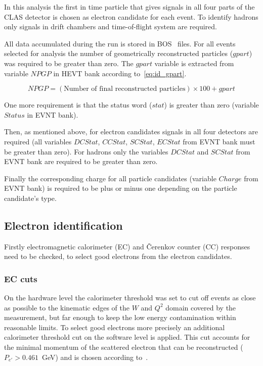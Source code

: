 In this analysis the first in time particle that gives signals in all four parts of the CLAS detector is chosen as electron candidate for each event. To identify hadrons only signals in drift chambers and time-of-flight system are required.

All data accumulated during the run is stored in BOS~\cite{BOS:bank} files. For all events selected for analysis the number of geometrically reconstructed particles ($gpart$) was required to be greater than zero. The $gpart$ variable is extracted from variable $NPGP$ in HEVT bank according to~\ref{eq:id_gpart}. 

\begin{equation}
NPGP=(\text{Number of final reconstructed particles})\times100 + gpart
\label{eq:id_gpart}
\end{equation}

One more requirement is that the status word ($stat$) is greater than zero (variable $Status$ in EVNT bank).

Then, as mentioned above, for electron candidates signals in all four detectors are required (all variables $DCStat$, $CCStat$, $SCStat$, $ECStat$ from EVNT bank must be greater than zero). For hadrons only the variables $DCStat$ and $SCStat$ from EVNT bank are required to be greater than zero. 

Finally the corresponding charge for all particle candidates (variable $Charge$ from EVNT bank) is required to be plus or minus one depending on the particle candidate's type.
 

\subsection{Electron identification}
\label{electron} 

Firstly electromagnetic calorimeter (EC) and \v Cerenkov counter (CC) responses need to be checked, to select good electrons from the electron candidates.

\subsubsection{EC cuts}
\label{ec_cuts}


On the hardware level the calorimeter threshold was set
to cut off events as close as possible to the kinematic edges
of the $W$ and $Q^{2}$ domain covered by the measurement, but far
enough to keep the low energy contamination within reasonable
limits. To select good electrons more precisely an additional calorimeter threshold cut on the software level  is applied. This cut accounts for the minimal momentum of the scattered electron that can be reconstructed ($P_{e'} > 0.461$~GeV) and is chosen according to~\cite{Egian:007}.

